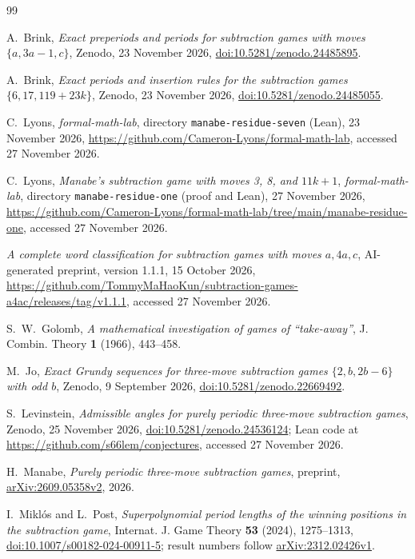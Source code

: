 \documentclass[11pt]{amsart}
\theoremstyle{definition}
\numberwithin{equation}{section}
\begin{document}
\begin{thebibliography}{99}
\raggedright

A.~Brink, \emph{Exact preperiods and periods for subtraction games with moves
$\{a,3a-1,c\}$}, Zenodo, 23 November 2026,
\href{https://doi.org/10.5281/zenodo.24485895}{doi:10.5281/zenodo.24485895}.

A.~Brink, \emph{Exact periods and insertion rules for the subtraction games
$\{6,17,119+23k\}$}, Zenodo, 23 November 2026,
\href{https://doi.org/10.5281/zenodo.24485055}{doi:10.5281/zenodo.24485055}.

C.~Lyons, \emph{formal-math-lab}, directory \texttt{manabe-residue-seven} (Lean),
23 November 2026, \url{https://github.com/Cameron-Lyons/formal-math-lab}, accessed
27 November 2026.

C.~Lyons, \emph{Manabe's subtraction game with moves 3, 8, and $11k+1$}, \emph{formal-math-lab},
directory \texttt{manabe-residue-one} (proof and Lean), 27 November 2026,
\url{https://github.com/Cameron-Lyons/formal-math-lab/tree/main/manabe-residue-one}, accessed
27 November 2026.

\emph{A complete word classification for subtraction games with moves $a,4a,c$},
AI-generated preprint, version 1.1.1, 15 October 2026,
\url{https://github.com/TommyMaHaoKun/subtraction-games-a4ac/releases/tag/v1.1.1}, accessed
27 November 2026.

S.~W.~Golomb, \emph{A mathematical investigation of games of ``take-away''}, J. Combin.
Theory \textbf{1} (1966), 443--458.

M.~Jo, \emph{Exact Grundy sequences for three-move subtraction games $\{2,b,2b-6\}$ with odd
$b$}, Zenodo, 9 September 2026,
\href{https://doi.org/10.5281/zenodo.22669492}{doi:10.5281/zenodo.22669492}.

S.~Levinstein, \emph{Admissible angles for purely periodic three-move subtraction games},
Zenodo, 25 November 2026,
\href{https://doi.org/10.5281/zenodo.24536124}{doi:10.5281/zenodo.24536124}; Lean code at
\url{https://github.com/s66lem/conjectures}, accessed 27 November 2026.

H.~Manabe, \emph{Purely periodic three-move subtraction games}, preprint,
\href{https://arxiv.org/abs/2609.05358v2}{arXiv:2609.05358v2}, 2026.

I.~Mikl\'os and L.~Post, \emph{Superpolynomial period lengths of the winning positions in the
subtraction game}, Internat. J. Game Theory \textbf{53} (2024), 1275--1313,
\href{https://doi.org/10.1007/s00182-024-00911-5}{doi:10.1007/s00182-024-00911-5}; result
numbers follow \href{https://arxiv.org/abs/2312.02426v1}{arXiv:2312.02426v1}.


\end{thebibliography}
\end{document}
